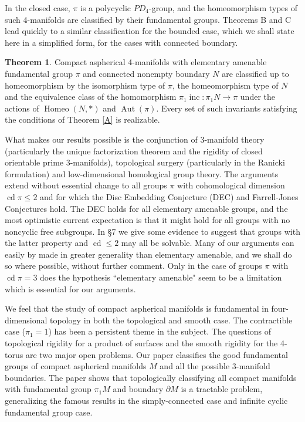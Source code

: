 \documentclass[12pt]{amsart}
\renewcommand{\leq}{\leqslant}
\theoremstyle{definition}
\newtheorem{maintheorem}{Theorem}
\DeclareMathOperator{\Aut}{Aut}
\DeclareMathOperator{\cd}{cd}
\DeclareMathOperator{\Homeo}{Homeo}
\DeclareMathOperator{\inc}{inc}
\begin{document}
In the closed case, $\pi$ is a polycyclic $PD_4$-group,
and the homeomorphism types of such 4-manifolds are classified  
by their fundamental groups.
Theorems B and C lead quickly to a similar classification for the bounded case,
which we shall state here in a simplified form, for the cases with connected boundary.

\begin{maintheorem} \label{D}
Compact aspherical 4-manifolds with elementary amenable fundamental group $\pi$ 
and connected nonempty boundary $N$ are classified up to homeomorphism by 
the isomorphism type of $\pi$, 
the homeomorphism type of $N$ and the equivalence class 
of the homomorphism $\pi_1\inc:\pi_1N\to\pi$ under the actions of $\Homeo(N,*)$ and $\Aut(\pi)$.  Every set of such invariants satisfying the conditions of Theorem \ref{A}
is realizable. 
\end{maintheorem}

What makes our results possible is the conjunction of 3-manifold theory 
(particularly the unique factorization theorem and the rigidity of closed orientable 
prime 3-manifolds), 
topological surgery (particularly in the Ranicki formulation)
and low-dimensional homological group theory.
The arguments extend without essential change to all groups $\pi$ with cohomological dimension
$\cd\pi\leq2$ and for which the Disc Embedding Conjecture (DEC) and 
Farrell-Jones Conjectures hold.
The DEC holds for all elementary amenable groups,
and the most optimistic current expectation is that it might hold 
for all groups with no noncyclic free subgroups.
In \S7 we give some evidence to suggest that groups with 
the latter property and $\cd\leq2$ may all be solvable.
Many of our arguments can easily by made in greater generality than elementary amenable,
and we shall do so where possible, without further comment.
Only in the case of groups $\pi$ with $\cd\pi=3$ does the hypothesis
``elementary amenable" seem to be a limitation which is essential for our arguments.

We feel that the study of compact aspherical manifolds is fundamental in four-dimensional topology in both the topological and smooth case.   The contractible case ($\pi_1 =1$) has been a persistent theme in the subject.   The questions of topological rigidity for a product of surfaces and the smooth rigidity for the 4-torus are two major open problems.   Our paper classifies the good fundamental groups of compact aspherical manifolds $M$ and all the possible 3-manifold boundaries.   The paper \cite{DKP} shows that topologically classifying all compact manifolds with fundamental group $\pi_1M$ and boundary $\partial M$ is a tractable problem, generalizing the famous results in the simply-connected case and infinite cyclic fundamental group case.
\end{document}

